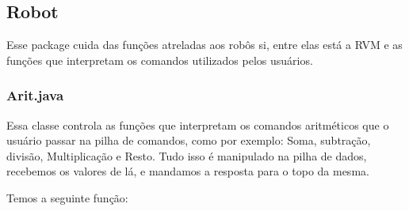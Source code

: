 \documentclass[a4paper]{article}
\begin{document}
	\subsection{Robot}
	    Esse package cuida das funções atreladas aos robôs
	    si, entre elas está a RVM e as funções que interpretam
	    os comandos utilizados pelos usuários.
	    
		\subsubsection{ Arit.java }
		    Essa classe controla as funções que interpretam
		    os comandos aritméticos que o usuário passar na
		    pilha de comandos, como por exemplo: Soma,
		    subtração, divisão, Multiplicação e Resto.
		    Tudo isso é manipulado na pilha de dados,
		    recebemos os valores de lá, e mandamos a resposta
		    para o topo da mesma.
		    
		    Temos a seguinte função:
		    
\end{document}
